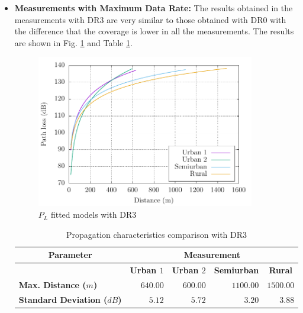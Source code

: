 \begin{itemize}
\item \textbf{Measurements with Maximum Data Rate:} The results obtained in the measurements with DR$3$ are very similar to those obtained with DR$0$ with the difference that the coverage is lower in all the measurements. The results are shown in Fig. \ref{fig:allfitteddr3} and Table \ref{tab:propagationcomparisondr3}.

\noindent
\begin{figure}[h!]
  \centering
  \includegraphics[width=0.9\textwidth]{./figures/Figure9/Figure9.pdf}
  \caption{$P_L$ fitted models with DR$3$}
  \label{fig:allfitteddr3}
\end{figure}


\begin{table}[h!]
\centering
\caption{Propagation characteristics comparison with DR$3$}
\label{tab:propagationcomparisondr3}
\begin{tabular}{@{}lrrrr@{}}
\toprule
\multicolumn{1}{c}{Parameter} & \multicolumn{4}{c}{\textbf{Measurement}}                                                                                          \\ \midrule
\textbf{}                              & \multicolumn{1}{c}{\textbf{Urban $1$}} & \multicolumn{1}{c}{\textbf{Urban $2$}} & \multicolumn{1}{c}{\textbf{Semiurban}} & \multicolumn{1}{c}{\textbf{Rural}} \\
\textbf{Max. Distance ($m$)}             & $640.00$                            & $600.00$                            & $1100.00$                           & $1500.00$                           \\
\textbf{Standard Deviation ($dB$)}       & $5.12$                           & $5.72$                           & $3.20$                           & $3.88$                           \\ \bottomrule
\end{tabular}
\end{table}

\end{itemize}


